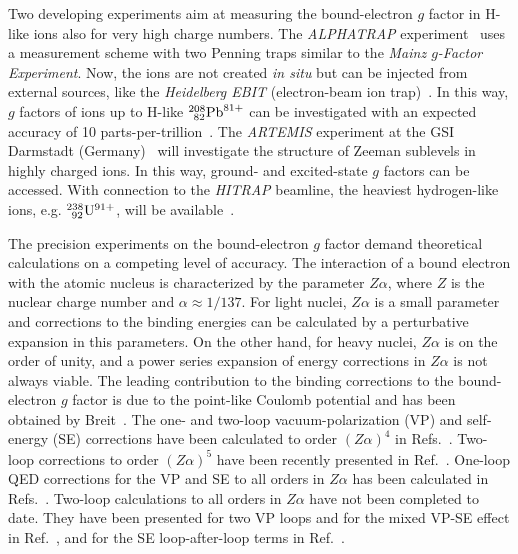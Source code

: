 Two developing experiments aim at measuring the bound-electron $g$ factor in H-like ions also for very high charge numbers. The \textit{ALPHATRAP} experiment~\cite{sturm2017} uses a measurement scheme with two Penning traps similar to the \textit{Mainz $g$-Factor Experiment}. Now, the ions are not created \textit{in situ} but can be injected from external sources, like the \textit{Heidelberg EBIT} (electron-beam ion trap)~\cite{ebit1999}. In this way, $g$ factors of ions up to H-like $^{208}_{\;\,82}\rm{Pb}^{81+}$ can be investigated with an expected accuracy of 10 parts-per-trillion~\cite{sturm2017}. The \textit{ARTEMIS} experiment at the GSI Darmstadt (Germany)~\cite{vogel2013,sturm2017} will investigate the structure of Zeeman sublevels in highly charged ions. In this way, ground- and excited-state $g$ factors can be accessed. With connection to the \textit{HITRAP} beamline, the heaviest hydrogen-like ions, e.g. $^{238}_{\;\,92}\rm{U}^{91+}$, will be available~\cite{vogel2015}.

The precision experiments on the bound-electron $g$ factor demand theoretical calculations on a competing level of accuracy. The interaction of a bound electron with the atomic nucleus is characterized by the parameter $Z\alpha$, where $Z$ is the nuclear charge number and $\alpha \approx 1/137$. For light nuclei, $Z\alpha$ is a small parameter and corrections to the binding energies can be calculated by a perturbative expansion in this parameters. On the other hand, for heavy nuclei, $Z\alpha$ is on the order of unity, and a power series expansion of energy corrections in $Z\alpha$ is not always viable. %
The leading contribution to the binding corrections to the bound-electron $g$ factor is due to the point-like Coulomb potential and has been obtained by Breit~\cite{breit1928}.
The one- and two-loop vacuum-polarization (VP) and self-energy (SE) corrections have been calculated to order $(Z\alpha)^4$ in Refs.~\cite{karshenboim2000,Pachucki2004,pachucki2004_err,Pachucki2005,czarnecki2016}. 
Two-loop corrections to order $(Z\alpha)^5$ have been recently presented in Ref.~\cite{czarnecki2018}.
One-loop QED corrections for the VP and SE to all orders in $Z\alpha$ has been calculated in Refs.~\cite{Beier2000,Karshenboim2001,yerokhin2002,Yerokhin2004,Lee2005,Lee2007,yerokhin2008,yerokhin2010,yerokhin2017}.
Two-loop calculations to all orders in $Z\alpha$ have not been completed to date. They have been presented for two VP loops and for the mixed VP-SE effect in Ref.~\cite{yerokhin2013}, and for the SE loop-after-loop terms in Ref.~\cite{sikora2018_arxiv}.

